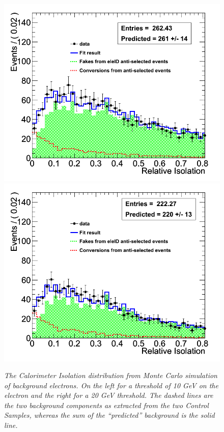 \begin{figure}[h!]
\centering
\includegraphics[scale=0.28]{Plots/caloIso_pt10_fit.png}
\includegraphics[scale=0.28]{Plots/caloIso_pt20_fit.png}
\caption{\textit{The Calorimeter Isolation distribution from Monte Carlo simulation of background electrons. On the left for a threshold of 10 GeV on the electron and the right for a 20 GeV threshold.  The dashed lines are the two background components as extracted from the two Control Samples, whereas the sum of the ``predicted'' background is the solid line.}}\label{fig:caloIso_fit}
\end{figure}


